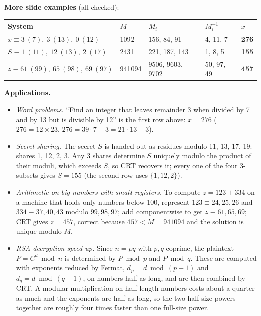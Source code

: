 \textbf{More slide examples} (all checked):
\begin{center}\small
\begin{tabular}{@{}lllll@{}}
\toprule
System & $M$ & $M_i$ & $M_i^{-1}$ & $x$\\
\midrule
$x \equiv 3\ (7),\ 3\ (13),\ 0\ (12)$ & 1092 & 156, 84, 91 & 4, 11, 7 & \textbf{276}\\
$S \equiv 1\ (11),\ 12\ (13),\ 2\ (17)$ & 2431 & 221, 187, 143 & 1, 8, 5 & \textbf{155}\\
$z \equiv 61\ (99),\ 65\ (98),\ 69\ (97)$ & 941094 & 9506, 9603, 9702 & 50, 97, 49 & \textbf{457}\\
\bottomrule
\end{tabular}
\end{center}

\textbf{Applications.}
\begin{itemize}
  \item \emph{Word problems.} ``Find an integer that leaves remainder 3 when divided by 7 and by 13 but is divisible by 12'' is the first row above: $x = 276$ ($276 = 12 \times 23$, $276 = 39 \cdot 7 + 3 = 21 \cdot 13 + 3$).
  \item \emph{Secret sharing.} The secret $S$ is handed out as residues modulo 11, 13, 17, 19: shares 1, 12, 2, 3. Any 3 shares determine $S$ uniquely modulo the product of their moduli, which exceeds $S$, so CRT recovers it; every one of the four 3-subsets gives $S = 155$ (the second row uses $\{1, 12, 2\}$).
  \item \emph{Arithmetic on big numbers with small registers.} To compute $z = 123 + 334$ on a machine that holds only numbers below 100, represent $123 \equiv 24, 25, 26$ and $334 \equiv 37, 40, 43$ modulo $99, 98, 97$; add componentwise to get $z \equiv 61, 65, 69$; CRT gives $z = 457$, correct because $457 < M = 941094$ and the solution is unique modulo $M$.
  \item \emph{RSA decryption speed-up.} Since $n = pq$ with $p, q$ coprime, the plaintext $P = C^d \bmod n$ is determined by $P \bmod p$ and $P \bmod q$. These are computed with exponents reduced by Fermat, $d_p = d \bmod (p - 1)$ and $d_q = d \bmod (q - 1)$, on numbers half as long, and are then combined by CRT. A modular multiplication on half-length numbers costs about a quarter as much and the exponents are half as long, so the two half-size powers together are roughly four times faster than one full-size power.
\end{itemize}

